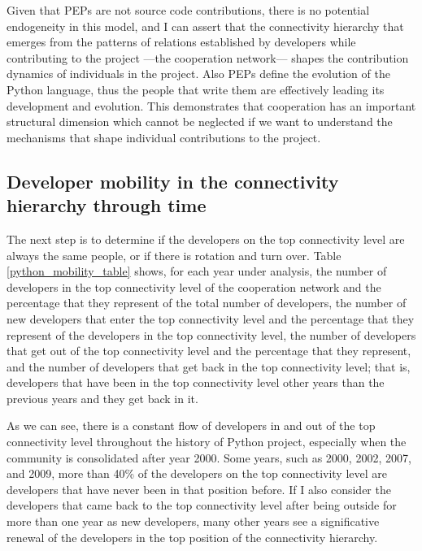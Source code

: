 Given that PEPs are not source code contributions, there is no potential endogeneity in this model, and I can assert that the connectivity hierarchy that emerges from the patterns of relations established by developers while contributing to the project ---the cooperation network--- shapes the contribution dynamics of individuals in the project. Also PEPs define the evolution of the Python language, thus the people that write them are effectively leading its development and evolution. This demonstrates that cooperation has an important structural dimension which cannot be neglected if we want to understand the mechanisms that shape individual contributions to the project.

\subsection{Developer mobility in the connectivity hierarchy through time}

The next step is to determine if the developers on the top connectivity level are always the same people, or if there is rotation and turn over. Table \ref{python_mobility_table} shows, for each year under analysis, the number of developers in the top connectivity level of the cooperation network and the percentage that they represent of the total number of developers, the number of new developers that enter the top connectivity level and the percentage that they represent of the developers in the top connectivity level, the number of developers that get out of the top connectivity level and the percentage that they represent, and the number of developers that get back in the top connectivity level; that is, developers that have been in the top connectivity level other years than the previous years and they get back in it.



As we can see, there is a constant flow of developers in and out of the top connectivity level throughout the history of Python project, especially when the community is consolidated after year 2000. Some years, such as 2000, 2002, 2007, and 2009, more than 40\% of the developers on the top connectivity level are developers that have never been in that position before. If I also consider the developers that came back to the top connectivity level after being outside for more than one year as new developers, many other years see a significative renewal of the developers in the top position of the connectivity hierarchy.

